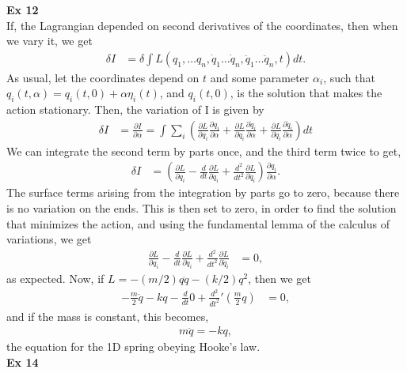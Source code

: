 \documentclass[10pt]{article}
\begin{document}
\textbf{Ex 12}\\
If, the Lagrangian depended on second derivatives of the coordinates, then when we vary it, we get
\begin{align*}
  \delta I &= \delta \int L(q_1, \dots q_n, \dot q_1 \dots \dot q_n, \ddot q_1 \dots \ddot q_n, t)dt.
\end{align*}
As usual, let the coordinates depend on $t$ and some parameter $\alpha_i$, 
such that $q_i(t,\alpha) = q_i(t,0) + \alpha \eta_i(t)$, and $q_i(t,0)$, 
is the solution that makes the action stationary.  Then, the variation of I 
is given by 
\begin{align*}
  \delta I &= \frac{\partial I}{\partial \alpha} = \int \sum_i \left(  \frac{\partial L}{\partial q_i}\frac{\partial q_i}{\partial \alpha} + \frac{\partial L}{\partial \dot q_i}\frac{\partial \dot q_i}{\partial \alpha} + \frac{\partial L}{\partial \ddot q_i}\frac{\partial \ddot q_i}{\partial \alpha} \right)dt
\end{align*}
We can integrate the second term by parts once, and the third term twice to 
get, 
\begin{align*}
  \delta I &= \left( \frac{\partial L}{\partial q_i}-\frac{d}{dt}\frac{\partial L}{\partial \dot q_i} + \frac{d^2}{dt^2}\frac{\partial L}{\partial \ddot q_i} \right) \frac{\partial q_i}{\partial \alpha}.
\end{align*}
The surface terms arising from the integration by parts go to zero, because 
there is no variation on the ends.  This is then set to zero, in order to 
find the solution that minimizes the action, and using the fundamental
lemma of the calculus of variations, we get
\begin{align*}
   \frac{\partial L}{\partial q_i}-\frac{d}{dt}\frac{\partial L}{\partial \dot q_i} + \frac{d^2}{dt^2}\frac{\partial L}{\partial \ddot q_i} &= 0,
\end{align*}
as expected.  Now, if $L=-(m/2)q\ddot q - (k/2) q^2$, then we get
\begin{align*}
  -\frac{m}{2}\ddot q -kq -\frac{d}{dt}0 + \frac{d^2}{dt^2}'\left(\frac{m}{2}q  \right) &= 0,
\end{align*}
and if the mass is constant, this becomes,
\begin{align*}
  m\ddot q = -kq,
\end{align*}
the equation for the 1D spring obeying Hooke's law.\\
\textbf{Ex 14}\\
\end{document}
